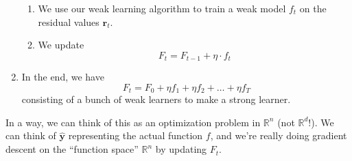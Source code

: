 \documentclass{article}
\begin{document}
\begin{definition}
\begin{enumerate}
\begin{enumerate}
                \item We use our weak learning algorithm to train a weak model $f_t$ on the residual values $\mathbf{r}_t$. 

                \item We update  
                  \begin{equation}
                    F_t = F_{t-1} + \eta \cdot f_t
                  \end{equation}
              \end{enumerate}
            \item In the end, we have 
              \begin{equation}
                F_t = F_0 + \eta f_1 + \eta f_2 + \ldots + \eta f_T
              \end{equation}
              consisting of a bunch of weak learners to make a strong learner. 
          \end{enumerate}
        \end{definition}

        In a way, we can think of this as an optimization problem in $\mathbb{R}^n$ (not $\mathbb{R}^d$!). We can think of $\hat{\mathbf{y}}$ representing the actual function $f$, and we're really doing gradient descent on the ``function space'' $\mathbb{R}^n$ by updating $F_t$. 
\end{document}
